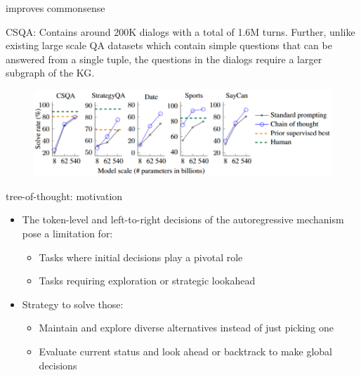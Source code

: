 \begin{vbframe}{\cotp improves commonsense}

\vfill

CSQA: Contains around 200K dialogs with a total of 1.6M
turns. Further, unlike existing large scale QA datasets
which contain simple questions that can be answered from a
single tuple, the questions in the dialogs require a larger
subgraph of the KG. 


\begin{figure}
    \centering
    \includegraphics{figure/cot_performance2.png}\\
\end{figure}

\vfill

\end{vbframe}


\begin{vbframe}{tree-of-thought: motivation}

\vfill

\begin{itemize}
\item The token-level and left-to-right decisions of the autoregressive mechanism pose a limitation for:
    \begin{itemize}
    \item Tasks where initial decisions play a pivotal role
    \item Tasks requiring exploration or strategic lookahead
    \end{itemize}
\item Strategy to solve those:
    \begin{itemize}
    \item Maintain and explore diverse alternatives instead of just picking one
    \item Evaluate current status and look ahead or backtrack to make global decisions
    \end{itemize}

\end{itemize}

\vfill

\end{vbframe}

